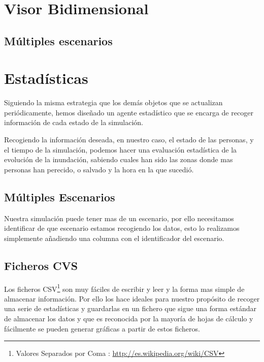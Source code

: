 \section*{Visor Bidimensional}
\subsection*{Múltiples escenarios}
\section*{Estadísticas}
Siguiendo la misma estrategia que los demás objetos que se actualizan
periódicamente, hemos diseñado un agente estadístico que se encarga de recoger
información de cada estado de la simulación.

Recogiendo la información deseada, en nuestro caso, el estado de las personas,
y el tiempo de la simulación, podemos hacer una evaluación estadística de la
evolución de la inundación, sabiendo cuales han sido las zonas donde mas
personas han perecido, o salvado y la hora en la que sucedió.
\subsection*{Múltiples Escenarios}
Nuestra simulación puede tener mas de un escenario, por ello necesitamos
identificar de que escenario estamos recogiendo los datos, esto lo realizamos
simplemente añadiendo una columna con el identificador del escenario.
\subsection*{Ficheros CVS}
Los ficheros CSV\footnote{Valores Separados por Coma :
\url{http://es.wikipedia.org/wiki/CSV}} son muy fáciles de escribir y leer y la
forma mas simple de almacenar información. Por ello los hace ideales para
nuestro propósito de recoger una serie de estadísticas y guardarlas en un
fichero que sigue una forma estándar de almacenar los datos y que es reconocida
por la mayoría de hojas de cálculo y fácilmente se pueden generar gráficas a 
partir de estos ficheros.